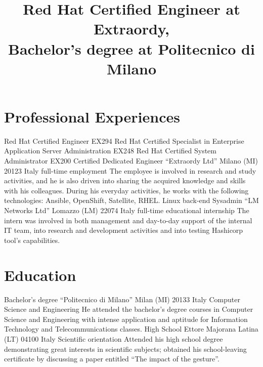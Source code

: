 
\title{\normalsize%
    Red Hat Certified Engineer at Extraordy,\\Bachelor's degree at Politecnico di Milano
}
\maketitle

\section{Professional Experiences}
    {Red Hat Certified Engineer}
    {EX294}
    {}
    {}
    {}
    {Red Hat Certified Specialist in Enterprise Application Server Administration}
    {EX248}
    {}
    {}
    {}
    {Red Hat Certified System Administrator}
    {EX200}
    {}
    {}
    {}
    {Certified Dedicated Engineer}
    {``Extraordy Ltd''}
    {Milano (MI) 20123 Italy}
    {full-time employment}
    {The employee is involved in research and study activities, and he is also driven into sharing the acquired knowledge and skills with his colleagues. During his everyday activities, he works with the following technologies: Ansible, OpenShift, Satellite, RHEL.}
    {Linux back-end Sysadmin}
    {``LM Networks Ltd''}
    {Lomazzo (LM) 22074 Italy}
    {full-time educational internship}
    {The intern was involved in both management and day-to-day support of the internal IT team, into research and development activities and into testing Hashicorp tool's capabilities.}

\section{Education}
    {Bachelor's degree}
    {``Politecnico di Milano''}
    {Milan (MI) 20133 Italy}
    {Computer Science and Engineering}
    {He attended the bachelor's degree courses in Computer Science and Engineering with intense application and aptitude for Information Technology and Telecommunications classes.}
    {High School}
    {Ettore Majorana}
    {Latina (LT) 04100 Italy}
    {Scientific orientation}
    {Attended his high school degree demonstrating great interests in scientific subjects; obtained his school-leaving certificate by discussing a paper entitled ``The impact of the gesture''.}

